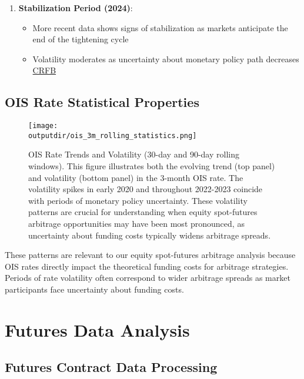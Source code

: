 \documentclass{article}
\newcommand{\outputdir}{../_output}
\begin{document}
\begin{enumerate}
  \item \textbf{Stabilization Period (2024)}:
  \begin{itemize}
    \item More recent data shows signs of stabilization as markets anticipate the end of the tightening cycle
    \item Volatility moderates as uncertainty about monetary policy path decreases \href{https://www.crfb.org/blogs/fed-cuts-rates-treasury-yields-are-rising}{CRFB}
  \end{itemize}
\end{enumerate}

\subsection{OIS Rate Statistical Properties}



\begin{figure}[H]
  \centering
  \texttt{[image: \\outputdir/ois\_3m\_rolling\_statistics.png]}
  \caption{OIS Rate Trends and Volatility (30-day and 90-day rolling windows). This figure illustrates both the evolving trend (top panel) and volatility (bottom panel) in the 3-month OIS rate. The volatility spikes in early 2020 and throughout 2022-2023 coincide with periods of monetary policy uncertainty. These volatility patterns are crucial for understanding when equity spot-futures arbitrage opportunities may have been most pronounced, as uncertainty about funding costs typically widens arbitrage spreads.}
  \label{fig:ois_rolling_stats}
\end{figure}

These patterns are relevant to our equity spot-futures arbitrage analysis because OIS rates directly impact the theoretical funding costs for arbitrage strategies. Periods of rate volatility often correspond to wider arbitrage spreads as market participants face uncertainty about funding costs.

\section{Futures Data Analysis}

\subsection{Futures Contract Data Processing}
\end{document}
